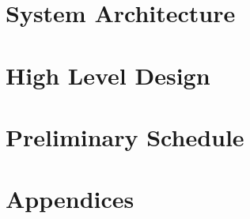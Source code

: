 \documentclass[a4paper,12pt]{article}
\begin{document}
\section{System Architecture}
\section{High Level Design}
\section{Preliminary Schedule}
\section{Appendices}


\newpage
\theendnotes
\end{document}
